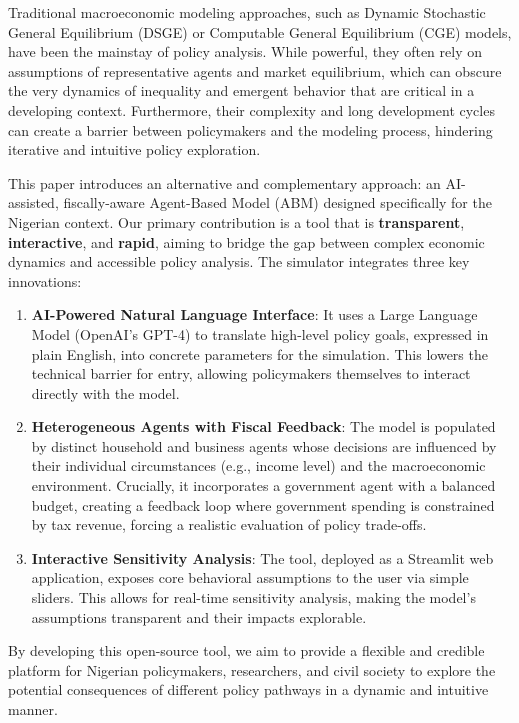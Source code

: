 \documentclass[
]{article}
\providecommand{\tightlist}{%
  \setlength{\itemsep}{0pt}\setlength{\parskip}{0pt}}
\begin{document}
Traditional macroeconomic modeling approaches, such as Dynamic
Stochastic General Equilibrium (DSGE) or Computable General Equilibrium
(CGE) models, have been the mainstay of policy analysis. While powerful,
they often rely on assumptions of representative agents and market
equilibrium, which can obscure the very dynamics of inequality and
emergent behavior that are critical in a developing context.
Furthermore, their complexity and long development cycles can create a
barrier between policymakers and the modeling process, hindering
iterative and intuitive policy exploration.

This paper introduces an alternative and complementary approach: an
AI-assisted, fiscally-aware Agent-Based Model (ABM) designed
specifically for the Nigerian context. Our primary contribution is a
tool that is \textbf{transparent}, \textbf{interactive}, and
\textbf{rapid}, aiming to bridge the gap between complex economic
dynamics and accessible policy analysis. The simulator integrates three
key innovations:

\begin{enumerate}
\def\labelenumi{\arabic{enumi}.}
\tightlist
\item
  \textbf{AI-Powered Natural Language Interface}: It uses a Large
  Language Model (OpenAI's GPT-4) to translate high-level policy goals,
  expressed in plain English, into concrete parameters for the
  simulation. This lowers the technical barrier for entry, allowing
  policymakers themselves to interact directly with the model.
\item
  \textbf{Heterogeneous Agents with Fiscal Feedback}: The model is
  populated by distinct household and business agents whose decisions
  are influenced by their individual circumstances (e.g., income level)
  and the macroeconomic environment. Crucially, it incorporates a
  government agent with a balanced budget, creating a feedback loop
  where government spending is constrained by tax revenue, forcing a
  realistic evaluation of policy trade-offs.
\item
  \textbf{Interactive Sensitivity Analysis}: The tool, deployed as a
  Streamlit web application, exposes core behavioral assumptions to the
  user via simple sliders. This allows for real-time sensitivity
  analysis, making the model's assumptions transparent and their impacts
  explorable.
\end{enumerate}

By developing this open-source tool, we aim to provide a flexible and
credible platform for Nigerian policymakers, researchers, and civil
society to explore the potential consequences of different policy
pathways in a dynamic and intuitive manner.
\end{document}
